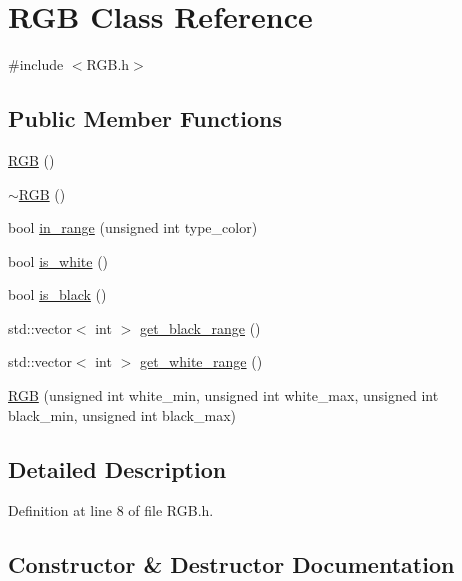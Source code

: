 \hypertarget{class_r_g_b}{}\section{R\+GB Class Reference}
\label{class_r_g_b}


{\ttfamily \#include $<$R\+G\+B.\+h$>$}

\subsection*{Public Member Functions}
\begin{DoxyCompactItemize}
\item 
\mbox{\hyperlink{class_r_g_b_ac82f37558b845c294de41eb2558c6619}{R\+GB}} ()
\item 
\mbox{\hyperlink{class_r_g_b_aba3fa8736bbef986a77b56613ddc6275}{$\sim$\+R\+GB}} ()
\item 
bool \mbox{\hyperlink{class_r_g_b_a61239b0df41eba4c53a2a7c6feaff698}{in\+\_\+range}} (unsigned int type\+\_\+color)
\item 
bool \mbox{\hyperlink{class_r_g_b_aa8289d37cc58a81e02b857fb91bfca5c}{is\+\_\+white}} ()
\item 
bool \mbox{\hyperlink{class_r_g_b_a6d5013f3b077886a1a92fa2b16628d22}{is\+\_\+black}} ()
\item 
std\+::vector$<$ int $>$ \mbox{\hyperlink{class_r_g_b_aa745e7dff1d7b49c78fa12da0c6e0835}{get\+\_\+black\+\_\+range}} ()
\item 
std\+::vector$<$ int $>$ \mbox{\hyperlink{class_r_g_b_a96764f94cfd38f38b0e975c3c77ffaa5}{get\+\_\+white\+\_\+range}} ()
\item 
\mbox{\hyperlink{class_r_g_b_acd5aafc2415ca6b82089d887e91e2035}{R\+GB}} (unsigned int white\+\_\+min, unsigned int white\+\_\+max, unsigned int black\+\_\+min, unsigned int black\+\_\+max)
\end{DoxyCompactItemize}


\subsection{Detailed Description}


Definition at line 8 of file R\+G\+B.\+h.



\subsection{Constructor \& Destructor Documentation}
\mbox{\label{class_r_g_b_ac82f37558b845c294de41eb2558c6619}} 
